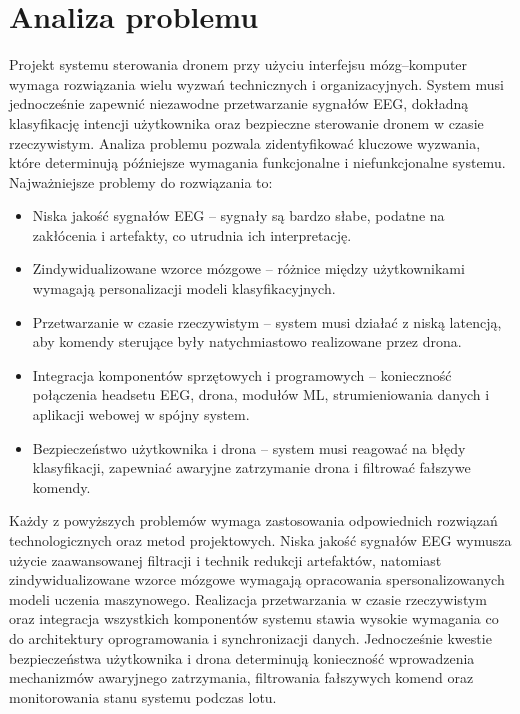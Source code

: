 \newpage
\section{Analiza problemu}		
Projekt systemu sterowania dronem przy użyciu interfejsu mózg–komputer wymaga rozwiązania wielu wyzwań technicznych i organizacyjnych. System musi jednocześnie zapewnić niezawodne przetwarzanie sygnałów EEG, dokładną klasyfikację intencji użytkownika oraz bezpieczne sterowanie dronem w czasie rzeczywistym. Analiza problemu pozwala zidentyfikować kluczowe wyzwania, które determinują późniejsze wymagania funkcjonalne i niefunkcjonalne systemu. Najważniejsze problemy do rozwiązania to:
\begin{itemize}
    \item Niska jakość sygnałów EEG – sygnały są bardzo słabe, podatne na zakłócenia i artefakty, co utrudnia ich interpretację.
    \item Zindywidualizowane wzorce mózgowe – różnice między użytkownikami wymagają personalizacji modeli klasyfikacyjnych.
    \item Przetwarzanie w czasie rzeczywistym – system musi działać z niską latencją, aby komendy sterujące były natychmiastowo realizowane przez drona.
    \item Integracja komponentów sprzętowych i programowych – konieczność połączenia headsetu EEG, drona, modułów ML, strumieniowania danych i aplikacji webowej w spójny system.
    \item Bezpieczeństwo użytkownika i drona – system musi reagować na błędy klasyfikacji, zapewniać awaryjne zatrzymanie drona i filtrować fałszywe komendy.
\end{itemize}

\noindent Każdy z powyższych problemów wymaga zastosowania odpowiednich rozwiązań technologicznych oraz metod projektowych. Niska jakość sygnałów EEG wymusza użycie zaawansowanej filtracji i technik redukcji artefaktów, natomiast zindywidualizowane wzorce mózgowe wymagają opracowania spersonalizowanych modeli uczenia maszynowego. Realizacja przetwarzania w czasie rzeczywistym oraz integracja wszystkich komponentów systemu stawia wysokie wymagania co do architektury oprogramowania i synchronizacji danych. Jednocześnie kwestie bezpieczeństwa użytkownika i drona determinują konieczność wprowadzenia mechanizmów awaryjnego zatrzymania, filtrowania fałszywych komend oraz monitorowania stanu systemu podczas lotu.
